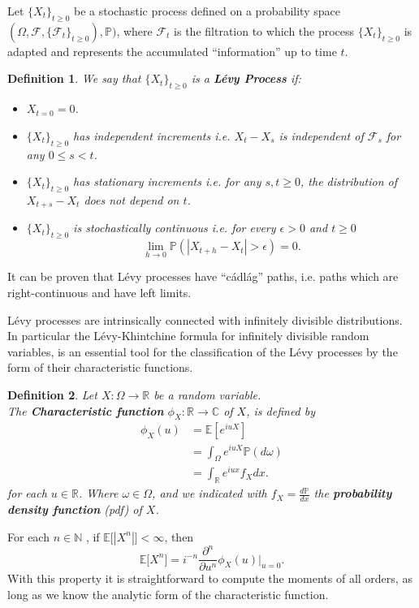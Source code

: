 \documentclass[a4paper,10pt]{article}
\newcommand{\numberset}{\mathbb}
\newcommand{\N}{\numberset{N}}
\newcommand{\R}{\numberset{R}}
\newcommand{\E}{\numberset{E}}
\newcommand{\C}{\numberset{C}}
\newcommand{\PP}{\numberset{P}}
\newtheorem{Definition}{Definition}[section]
\begin{document}
Let $\{X_t\}_{t \ge 0}$ be a stochastic process defined on a probability space $(\Omega,\mathcal{F},\{\mathcal{F}_t\}_{t \ge 0}),\PP)$, 
where $\mathcal{F}_t$ is the filtration to which the process $\{X_t\}_{t \ge 0}$ is adapted and represents the accumulated ``information'' up to time $t$.\\ 
\begin{Definition}\label{LevyDef}
We say that $\{X_t\}_{t \ge 0}$ is a \textbf{Lévy Process} if:
\begin{itemize}
 \item[(\textbf{L1})] $X_{t=0} = 0$.
 \item[(\textbf{L2})] $\{X_t\}_{t \ge 0}$ has independent increments i.e. $X_t - X_s$ is independent of $\mathcal{F}_s$ for any $0 \leq s < t$.
 \item[(\textbf{L3})] $\{X_t\}_{t \ge 0}$ has stationary increments i.e. for any $s,t \geq 0$, the distribution of $X_{t+s} - X_t$ does not depend on $t$.
 \item[(\textbf{L4})] $\{X_t\}_{t \ge 0}$ is stochastically continuous i.e. for every $\epsilon > 0 $ and $t \ge 0$  $$\lim_{h\to 0} \PP(|X_{t+h}-X_t| > \epsilon)=0. $$ 
\end{itemize}
\end{Definition}
It can be proven that Lévy processes have ``cádlág''
paths, i.e. paths which are right-continuous and have left limits. 

Lévy processes are intrinsically connected with infinitely divisible distributions. In particular the Lévy-Khintchine formula 
for infinitely divisible random variables, is an essential tool for the classification of the Lévy processes by the form of their
characteristic functions.

\begin{Definition} \label{chf}
Let $X: \Omega \to \R$ be a random variable.\\ 
The \textbf{Characteristic function} $\phi_X:\R \to \C$  of $X$, is defined by
\begin{align}
\phi_{X}(u) &= \E [e^{iuX}] \nonumber \\
            &= \int_{\Omega} e^{iuX} \PP(d\omega) \nonumber \\
            &= \int_{\R} e^{iux} f_X dx.
\end{align}
for each $u \in \R$. Where $\omega \in \Omega$, and we indicated with $f_X = \frac{d\PP}{dx}$ the \textbf{probability density function} (pdf) of $X$.
\end{Definition}
For each $n \in \N$ , if $\E\bigl[ |X^{n}| \bigr] < \infty$, then 
\begin{equation}\label{moments}
 \E\bigl[ X^{n} \bigr] = i^{-n}\frac{\partial^n}{\partial u^{n}} \phi_X(u) \biggr|_{u=0} .
\end{equation}
With this property it is straightforward to compute the moments of all orders, as long as we know the analytic form 
of the characteristic function.
\end{document}
